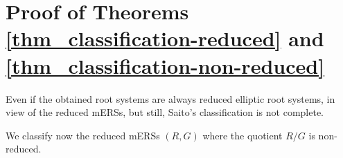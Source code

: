 \documentclass[11pt]{amsart}
\newcommand{\Aut}{\mathrm{Aut}}
\begin{document}


\section[Proof of weak classification theorems]{Proof of Theorems \ref{thm_classification-reduced} and \ref{thm_classification-non-reduced} }
\label{sect_mers-II}
Even if the obtained root systems are always reduced elliptic root systems, in view of the reduced mERSs, but still, Saito's classification is not complete. 

We classify now the reduced mERSs $(R,G)$ where the quotient $R/G$ is non-reduced. 
\end{document}

